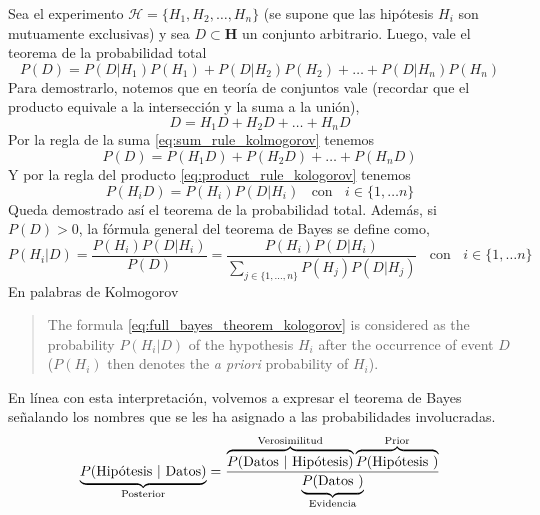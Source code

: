 \documentclass[a4paper,11pt]{book}
\theoremstyle{definition}
\begin{document}
Sea el experimento $\mathcal{H}= \{ H_1, H_2, \dots, H_n \}$ (se supone que las hip\'otesis $H_i$ son mutuamente exclusivas) y sea $D \subset \textbf{H}$ un conjunto arbitrario.
%
Luego, vale el teorema de la probabilidad total
%
\begin{equation}
P(D) = P(D|H_1)P(H_1) + P(D|H_2)P(H_2) + \dots + P(D|H_n)P(H_n)
\end{equation}
%
Para demostrarlo, notemos que en teor\'ia de conjuntos vale (recordar que el producto equivale a la intersecci\'on y la suma a la uni\'on),
%
\begin{equation*}
D = H_1D + H_2D + \dots + H_nD
\end{equation*}
%
Por la regla de la suma \eqref{eq:sum_rule_kolmogorov} tenemos
%
\begin{equation*}
P(D) = P(H_1D) + P(H_2D) + \dots + P(H_nD)
\end{equation*}
%
Y por la regla del producto \eqref{eq:product_rule_kologorov} tenemos
%
\begin{equation*}
P(H_i D ) = P(H_i) P(D|H_i) \ \ \ \ \text{con} \ \ \ \ i \in \{1,\dots n\}
\end{equation*}
%
Queda demostrado as\'i el teorema de la probabilidad total.
%
Adem\'as, si $P(D)>0$, la f\'ormula general del teorema de Bayes se define como,
%
\begin{equation} \label{eq:full_bayes_theorem_kologorov}
P(H_i|D) = \frac{P(H_i) P(D|H_i)}{P(D)} = \frac{P(H_i) P(D|H_i)}{\sum_{j \in \{1, \dots, n \} } P(H_j) P(D|H_j) } \ \ \ \ \text{con} \ \ \ \ i \in \{1,\dots n\}
\end{equation}
%
En palabras de Kolmogorov
%
\begin{quotation}
The formula \eqref{eq:full_bayes_theorem_kologorov} is considered as the probability $P(H_i|D)$ of the hypothesis $H_i$ after the occurrence of event $D$ ($P(H_i)$ then denotes the \emph{a priori} probability of $H_i$).
\end{quotation}
%
En l\'inea con esta interpretaci\'on, volvemos a expresar el teorema de Bayes se\~nalando los nombres que se les ha asignado a las probabilidades involucradas.
%
\begin{equation}\label{eq:teorema_bayes}
\underbrace{P(\text{Hip\'otesis }|\text{ Datos})}_{\text{\scriptsize Posterior}} = \frac{\overbrace{P(\text{Datos }|\text{ Hip\'otesis})}^{\text{\scriptsize Verosimilitud}} \overbrace{P(\text{Hip\'otesis })}^{\text{\scriptsize Prior}} }{\underbrace{P(\text{Datos })}_{\text{\scriptsize Evidencia}}}
\end{equation}
\end{document}
